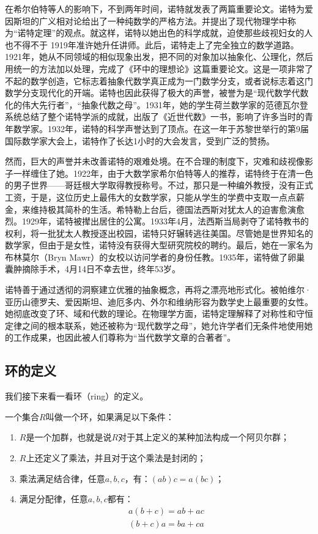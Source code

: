 \documentclass{article}
\begin{document}
在希尔伯特等人的影响下，不到两年时间，诺特就发表了两篇重要论文。诺特为爱因斯坦的广义相对论给出了一种纯数学的严格方法。并提出了现代物理学中称为“诺特定理”的观点。就这样，诺特以她出色的科学成就，迫使那些歧视妇女的人也不得不于 1919年准许她升任讲师。此后，诺特走上了完全独立的数学道路。1921年，她从不同领域的相似现象出发，把不同的对象加以抽象化、公理化，然后用统一的方法加以处理，完成了《环中的理想论》这篇重要论文。这是一项非常了不起的数学创造，它标志着抽象代数学真正成为一门数学分支，或者说标志着这门数学分支现代化的开端。诺特也因此获得了极大的声誉，被誉为是“现代数学代数化的伟大先行者”，“抽象代数之母”。1931年，她的学生荷兰数学家的范德瓦尔登系统总结了整个诺特学派的成就，出版了《近世代数》一书，影响了许多当时的青年数学家。1932年，诺特的科学声誉达到了顶点。在这一年于苏黎世举行的第9届国际数学家大会上，诺特作了长达1小时的大会发言，受到广泛的赞扬。

然而，巨大的声誉并未改善诺特的艰难处境。在不合理的制度下，灾难和歧视像影子一样缠住了她。1922年，由于大数学家希尔伯特等人的推荐，诺特终于在清一色的男子世界——哥廷根大学取得教授称号。不过，那只是一种编外教授，没有正式工资，于是，这位历史上最伟大的女数学家，只能从学生的学费中支取一点点薪金，来维持极其简朴的生活。希特勒上台后，德国法西斯对犹太人的迫害愈演愈烈。1929年，诺特被撵出居住的公寓。1933年4月，法西斯当局剥夺了诺特教书的权利，将一批犹太人教授逐出校园，诺特只好辗转逃往美国。尽管她是世界知名的数学家，但由于是女性，诺特没有获得大型研究院校的聘约。最后，她在一家名为布林莫尔（Bryn Mawr）的女校以访问学者的身份任教。1935年，诺特做了卵巢囊肿摘除手术，4月14日不幸去世，终年53岁。

诺特善于通过透彻的洞察建立优雅的抽象概念，再将之漂亮地形式化。被帕维尔·亚历山德罗夫、爱因斯坦、迪厄多内、外尔和维纳形容为数学史上最重要的女性。她彻底改变了环、域和代数的理论。在物理学方面，诺特定理解释了对称性和守恒定律之间的根本联系，她还被称为“现代数学之母”，她允许学者们无条件地使用她的工作成果，也因此被人们尊称为“当代数学文章的合著者”\cite{Wiki-Noether}。

\subsection{环的定义}
我们接下来看一看环（ring）的定义。

\begin{definition}
一个集合$R$叫做一个环，如果满足以下条件：
\begin{enumerate}
\item $R$是一个加群，也就是说$R$对于其上定义的某种加法构成一个阿贝尔群；
\item $R$上还定义了乘法，并且对于这个乘法是封闭的；
\item 乘法满足结合律，任意$a, b, c$，有：$(ab)c = a(bc)$；
\item 满足分配律，任意$a, b, c$都有：
\[
\begin{array}{l}
a(b + c) = ab + ac \\
(b + c)a = ba + ca
\end{array}
\]
\end{enumerate}
\end{definition}
\end{document}
